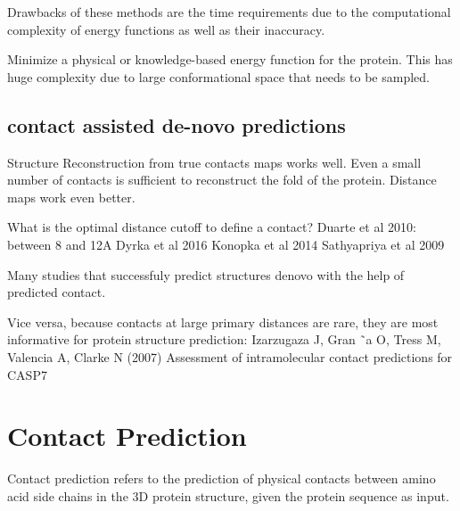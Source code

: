 \documentclass[12pt,a4paper,twoside]{book}
\theoremstyle{definition}
\theoremstyle{definition}
\theoremstyle{remark}
\begin{document}
Drawbacks of these methods are the time requirements due to the
computational complexity of energy functions as well as their
inaccuracy.

Minimize a physical or knowledge-based energy function for the protein.
This has huge complexity due to large conformational space that needs to
be sampled.

\subsection{contact assisted de-novo
predictions}\label{contact-assisted-str-pred}

Structure Reconstruction from true contacts maps works well. Even a
small number of contacts is sufficient to reconstruct the fold of the
protein. Distance maps work even better.

What is the optimal distance cutoff to define a contact? Duarte et al
2010: between 8 and 12A Dyrka et al 2016 Konopka et al 2014 Sathyapriya
et al 2009

Many studies that successfuly predict structures denovo with the help of
predicted contact.

Vice versa, because contacts at large primary distances are rare, they
are most informative for protein structure prediction: Izarzugaza J,
Gran ˜a O, Tress M, Valencia A, Clarke N (2007) Assessment of
intramolecular contact predictions for CASP7

\section{Contact Prediction}\label{contact-prediction}

Contact prediction refers to the prediction of physical contacts between
amino acid side chains in the 3D protein structure, given the protein
sequence as input.
\end{document}
